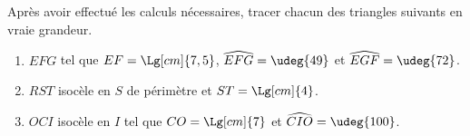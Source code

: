 \begin{exercice*}
   Après avoir effectué les calculs nécessaires, tracer chacun des triangles suivants en vraie grandeur.
   \begin{enumerate}
      \item $EFG$ tel que $EF =\Lg[cm]{7,5}$, $\widehat{EFG}=\udeg{49}$ et $\widehat{EGF}=\udeg{72}$.
      \item $RST$ isocèle en $S$ de périmètre  et $ST=\Lg[cm]{4}$.
      \item $OCI$ isocèle en $I$ tel que $CO=\Lg[cm]{7}$ et $\widehat{CIO} =\udeg{100}$.
   \end{enumerate}
\end{exercice*}
